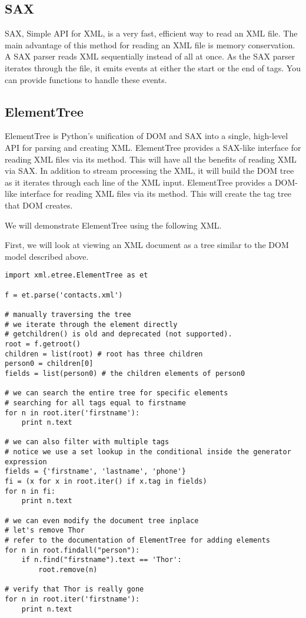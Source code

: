 \subsection*{SAX}
SAX, Simple API for XML, is a very fast, efficient way to read an XML file.
The main advantage of this method for reading an XML file is memory conservation.
A SAX parser reads XML sequentially instead of all at once.
As the SAX parser iterates through the file, it emits events at either the start or the end of tags.
You can provide functions to handle these events.


\subsection*{ElementTree}
ElementTree is Python's unification of DOM and SAX into a single, high-level API for parsing and creating XML.
ElementTree provides a SAX-like interface for reading XML files via its  method.
This will have all the benefits of reading XML via SAX.
In addition to stream processing the XML, it will build the DOM tree as it iterates through each line of the XML input.
ElementTree provides a DOM-like interface for reading XML files via its  method.
This will create the tag tree that DOM creates.

We will demonstrate ElementTree using the following XML.


First, we will look at viewing an XML document as a tree similar to the DOM model described above.
\begin{lstlisting}
import xml.etree.ElementTree as et

f = et.parse('contacts.xml')

# manually traversing the tree
# we iterate through the element directly
# getchildren() is old and deprecated (not supported).
root = f.getroot()
children = list(root) # root has three children
person0 = children[0]
fields = list(person0) # the children elements of person0

# we can search the entire tree for specific elements
# searching for all tags equal to firstname
for n in root.iter('firstname'):
    print n.text
    
# we can also filter with multiple tags 
# notice we use a set lookup in the conditional inside the generator expression
fields = {'firstname', 'lastname', 'phone'}
fi = (x for x in root.iter() if x.tag in fields)
for n in fi:
    print n.text
    
# we can even modify the document tree inplace
# let's remove Thor
# refer to the documentation of ElementTree for adding elements
for n in root.findall("person"):
    if n.find("firstname").text == 'Thor':
        root.remove(n)

# verify that Thor is really gone
for n in root.iter('firstname'):
    print n.text
\end{lstlisting}

